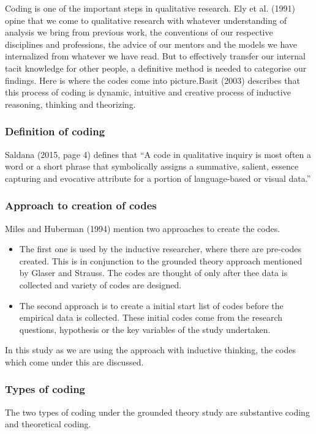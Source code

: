 Coding is one of the important steps in qualitative research. Ely et al. (1991) opine that we come to qualitative research with whatever understanding of analysis we bring from previous work, the conventions of our respective disciplines and professions, the advice of our mentors and the models we have internalized from whatever we have read. But to effectively transfer our internal tacit knowledge for other people, a definitive method is needed to categorise our findings. Here is where the codes come into picture.Basit (2003) describes that this process of coding is dynamic, intuitive and creative process of inductive reasoning, thinking and theorizing.\\

\subsubsection{Definition of coding}
Saldana (2015, page 4) defines that “A code in qualitative inquiry is most often a word or a short phrase that symbolically assigns a summative, salient, essence capturing and evocative attribute for a portion of language-based or visual data.” 


\subsubsection{Approach to creation of codes}
Miles and Huberman (1994) mention two approaches to create the codes. \\
\begin{itemize}
    \item The first one is used by the inductive researcher, where there are pre-codes created. This is in conjunction to the grounded theory approach mentioned by Glaser and Strauss. The codes are thought of only after thee data is collected and variety of codes are designed.\\
    \item The second approach is to create a initial start list of codes before the empirical data is collected. These initial codes come from the research questions, hypothesis or the key variables of the study undertaken. \\
\end{itemize}
In this study as we are using the approach with inductive thinking, the codes which come under this are discussed.\\

\subsubsection{Types of coding}
The two types of coding under the grounded theory study are substantive coding and theoretical coding.\\

